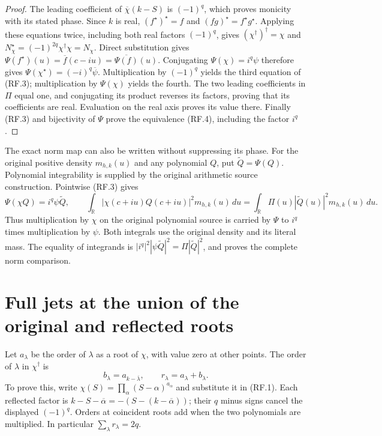 \documentclass[11pt]{article}
\newcommand{\R}{\mathbb R}
\begin{document}
\begin{proof}
The leading coefficient of $\overline\chi(k-S)$ is $(-1)^q$,
which proves monicity with its stated phase. Since $k$ is real,
$(f^\star)^\star=f$ and $(fg)^\star=f^\star g^\star$.
Applying these equations twice, including both real factors $(-1)^q$,
gives $(\chi^\dagger)^\dagger=\chi$ and
$N_\chi^\star=(-1)^{2q}\chi^\dagger\chi=N_\chi$.
Direct substitution gives
$\Psi(f^\star)(u)=\overline f(c-iu)=\overline{\Psi(f)}(u)$.
Conjugating $\Psi(\chi)=i^q\psi$ therefore gives
$\Psi(\chi^\star)=(-i)^q\overline\psi$.
Multiplication by $(-1)^q$ yields the third equation of (RF.3);
multiplication by $\Psi(\chi)$ yields the fourth. The two leading
coefficients in $\Pi$ equal one, and conjugating its product reverses
its factors, proving that its coefficients are real. Evaluation on
the real axis proves its value there. Finally (RF.3) and bijectivity
of $\Psi$ prove the equivalence (RF.4), including the factor $i^q$.
\end{proof}

The exact norm map can also be written without suppressing its phase.
For the original positive density $m_{h,k}(u)$ and any polynomial $Q$,
put $\widetilde Q=\Psi(Q)$. Polynomial integrability is supplied by the
original arithmetic source construction. Pointwise (RF.3) gives
\[
 \Psi(\chi Q)=i^q\psi\widetilde Q,
 \qquad
 \int_\R|\chi(c+iu)Q(c+iu)|^2m_{h,k}(u)\,du
 =\int_\R\Pi(u)|\widetilde Q(u)|^2m_{h,k}(u)\,du.
 \tag{RF.5}
\]
Thus multiplication by $\chi$ on the original polynomial source is
carried by $\Psi$ to $i^q$ times multiplication by $\psi$. Both
integrals use the original density and its literal mass. The equality
of integrands is $|i^q|^2|\psi\widetilde Q|^2
=\Pi|\widetilde Q|^2$, and proves the complete norm comparison.

\section{Full jets at the union of the original and reflected roots}

Let $a_\lambda$ be the order of $\lambda$ as a root of $\chi$, with
value zero at other points. The order of $\lambda$ in $\chi^\dagger$
is
\[
 b_\lambda=a_{k-\overline\lambda},\qquad
 r_\lambda=a_\lambda+b_\lambda.
 \tag{RF.6}
\]
To prove this, write $\chi(S)=\prod_\alpha(S-\alpha)^{a_\alpha}$
and substitute it in (RF.1). Each reflected factor is
$k-S-\overline\alpha=-(S-(k-\overline\alpha))$;
their $q$ minus signs cancel the displayed $(-1)^q$. Orders at
coincident roots add when the two polynomials are multiplied.
In particular $\sum_\lambda r_\lambda=2q$.
\end{document}
